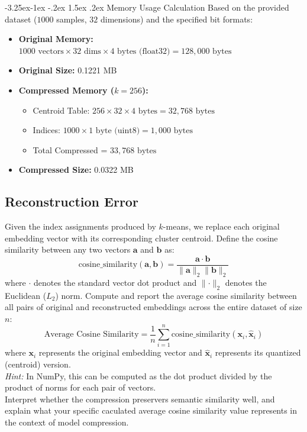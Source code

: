 \documentclass[twoside, 10pt]{article}
\makeatletter
\renewcommand{\paragraph}{\@startsection{paragraph}{4}{\z@}%
    {-3.25ex\@plus -1ex \@minus -.2ex}%
    {1.5ex \@plus .2ex}%
    {\normalfont\normalsize\bfseries}}
\makeatother
\begin{document}
\paragraph{Memory Usage Calculation}
Based on the provided dataset ($1000$ samples, $32$ dimensions) and the specified bit formats:
\begin{itemize}
    \item \textbf{Original Memory:} $1000 \text{ vectors} \times 32 \text{ dims} \times 4 \text{ bytes (float32)} = 128,000 \text{ bytes}$
    \item \textbf{Original Size:} 0.1221 MB
    \item \textbf{Compressed Memory ($k=256$):}
    \begin{itemize}
        \item Centroid Table: $256 \times 32 \times 4 \text{ bytes} = 32,768 \text{ bytes}$
        \item Indices: $1000 \times 1 \text{ byte (uint8)} = 1,000 \text{ bytes}$
        \item Total Compressed = $33,768 \text{ bytes}$
    \end{itemize}
    \item \textbf{Compressed Size:} 0.0322 MB
\end{itemize}

\subsection{Reconstruction Error}
Given the index assignments produced by $k$-means, we replace each original embedding vector with its corresponding cluster centroid. Define the cosine similarity between any two vectors $\mathbf{a}$ and $\mathbf{b}$ as:
\begin{equation}
\text{cosine\_similarity}(\mathbf{a}, \mathbf{b}) = \frac{\mathbf{a} \cdot \mathbf{b}}{\lVert\mathbf{a}\rVert_2 \lVert\mathbf{b}\rVert_2}
\end{equation}
where $\cdot$ denotes the standard vector dot product and $\lVert \cdot \rVert_2$ denotes the Euclidean ($L_2$) norm. Compute and report the average cosine similarity between all pairs of original and reconstructed embeddings across the entire dataset of size $n$:
\begin{equation}
\text{Average Cosine Similarity} = \frac{1}{n} \sum_{i=1}^{n} \text{cosine\_similarity}(\mathbf{x}_i, \mathbf{\hat{x}}_i)
\end{equation}
where $\mathbf{x}_i$ represents the original embedding vector and $\mathbf{\hat{x}}_i$ represents its quantized (centroid) version. \\
\textit{Hint:} In NumPy, this can be computed as the dot product divided by the product of norms for each pair of vectors. \\
Interpret whether the compression preservers semantic similarity well, and explain what your specific caculated average cosine similarity value represents in the context of model compression.
\end{document}
